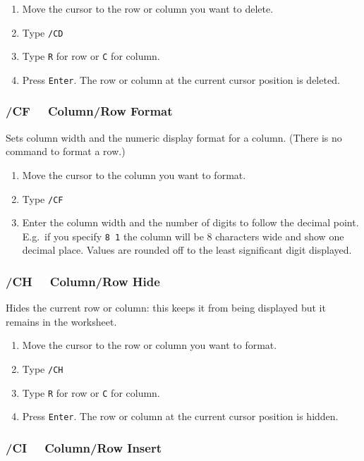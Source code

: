 \documentclass[titlepage]{article}
\begin{document}
\usage{}
\begin{enumerate}\itemsep -2pt
\item Move the cursor to the row or column you want to delete.
\item Type \texttt{/CD}
\item Type \texttt{R} for row or \texttt{C} for column.
\item Press \texttt{Enter}.  The row or column at the current cursor
  position is deleted.
\end{enumerate}


\subsubsection{/CF \ \ Column/Row Format}
        
Sets column width and the numeric display format for a column.  (There
is no command to format a row.)

\usage{}
\begin{enumerate}\itemsep -2pt
\item Move the cursor to the column you want to format.
\item Type \texttt{/CF}
\item Enter the column width and the number of digits to follow the
  decimal point.  E.g.\ if you specify \texttt{8 1} the column will be
  8 characters wide and show one decimal place.  Values are rounded
  off to the least significant digit displayed.
\end{enumerate}

\subsubsection{/CH \ \  Column/Row Hide}

Hides the current row or column: this keeps it from being displayed
but it remains in the worksheet.

\usage{}
\begin{enumerate}\itemsep -2pt
\item Move the cursor to the row or column you want to format.
\item Type \texttt{/CH}
\item Type \texttt{R} for row or \texttt{C} for column.
\item Press \texttt{Enter}.  The row or column at the current cursor
  position is hidden.
\end{enumerate}

\subsubsection{/CI \ \ Column/Row Insert}
\end{document}

